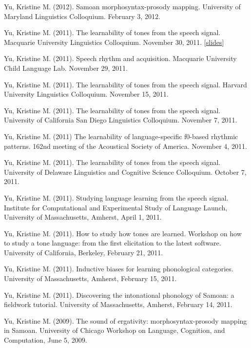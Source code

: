 \documentclass[10pt]{article}
\begin{document}
\begin{bibenum}
    \item Yu, Kristine M. (2012). Samoan morphosyntax-prosody
      mapping. University of Maryland Linguistics Colloquium. February
      3, 2012.

    \item Yu, Kristine M. (2011). The learnability of tones from the
      speech signal. Macquarie University Linguistics
      Colloquium. November 30, 2011. [\href{https://speakerdeck.com/krisyu/the-learnability-of-the-tones-from-the-speech-signal}{slides}]

    \item Yu, Kristine M. (2011). Speech rhythm and
      acquisition. Macquarie University Child Language Lab. November 29, 2011.

    \item Yu, Kristine M. (2011). The learnability of tones from the
      speech signal. Harvard University Linguistics
      Colloquium. November 15, 2011.

    \item Yu, Kristine M. (2011). The learnability of tones from the
      speech signal. University of California San Diego Linguistics
      Colloquium. November 7, 2011.

    \item Yu, Kristine M. (2011) The learnability of language-specific
      f0-based rhythmic patterns. 162nd meeting of the Acoustical
      Society of America. November 4, 2011.

    \item Yu, Kristine M. (2011). The learnability of tones from the
      speech signal. University of Delaware Linguistics and Cognitive
      Science Colloquium. October 7, 2011.

    \item Yu, Kristine M. (2011). Studying language learning from the
      speech signal. Institute for Computational and Experimental
      Study of Language Launch, University of Massachusetts, Amherst, April 1, 2011.

    \item Yu, Kristine M. (2011). How to study how tones are learned. Workshop on how to
      study a tone language: from the first elicitation to the latest
      software. University of California, Berkeley, February 21, 2011.

    \item Yu, Kristine M. (2011). Inductive biases for learning
      phonological categories. University of Massachusetts, Amherst, February 15, 2011.

    \item Yu, Kristine M. (2011). Discovering the intonational
      phonology of Samoan: a fieldwork tutorial. University of
      Massachusetts, Amherst, February 14, 2011.

    \item Yu, Kristine M. (2009). The sound of ergativity: morphosyntax-prosody mapping in
      Samoan. University of Chicago Workshop on Language, Cognition,
      and Computation, June 5, 2009.

\end{bibenum}
\end{document}
